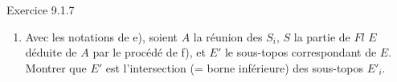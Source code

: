 \begin{enonce*}[remark]{Exercice 9.1.7}
\begin{enumerate}
\begin{enumerate}
\item $u$ est l'un des facteurs d'une flèche composées dont
l'autre facteur ainsi que le composé sont dans $A_n$.

\item $u$ est une somme d'une petite famille de flèches $\in
A_n$.

\item ll existe un épimorphisme $Y'\rightarrow Y$, tel que
$u'=X'=\fprod{X}{Y'}{Y}\rightarrow Y'$ déduit de $u$ par changement
de base soit dans $A_n$.
\end{enumerate}

\item Avec les notations de e), soient $A$ la réunion des $S_i$, $S$
la partie de $Fl$ $E$ déduite de $A$ par le procédé de f), et $E'$
le sous-topos correspondant de $E$. Montrer que $E'$ est
l'intersection (= borne inférieure) des sous-topos $E'_i$.
\end{enumerate}
\end{enonce*}


